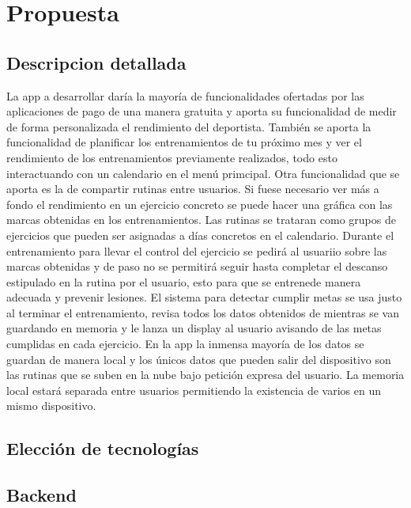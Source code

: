 \chapter{Propuesta}

\section{Descripcion detallada}

La app a desarrollar daría la mayoría de funcionalidades ofertadas por las aplicaciones de pago de una manera gratuita y aporta su funcionalidad de medir de forma personalizada el rendimiento del deportista. También se aporta la funcionalidad de planificar los entrenamientos de tu próximo mes y ver el rendimiento de los entrenamientos previamente realizados, todo esto interactuando con un calendario en el menú primcipal. Otra funcionalidad que se aporta es la de compartir rutinas entre usuarios. Si fuese necesario ver más a fondo el rendimiento en un ejercicio concreto se puede hacer una gráfica con las marcas obtenidas en los entrenamientos. Las rutinas se trataran como grupos de ejercicios que pueden ser asignadas a días concretos en el calendario. Durante el entrenamiento para llevar el control del ejercicio se pedirá al usuariio sobre las marcas obtenidas y de paso no se permitirá seguir hasta completar el descanso estipulado en la rutina por el usuario, esto para que se entrenede manera adecuada y prevenir lesiones. El sistema para detectar cumplir metas se usa justo al terminar el entrenamiento, revisa todos los datos obtenidos de mientras se van guardando en memoria y le lanza un display al usuario avisando de las metas cumplidas en cada ejercicio. En la app la inmensa mayoría de los datos se guardan de manera local y los únicos datos que pueden salir del dispositivo son las rutinas que se suben en la nube bajo petición expresa del usuario. La memoria local estará separada entre usuarios permitiendo la existencia de varios en un mismo dispositivo.

\section{Elección de tecnologías}

\section{Backend}

